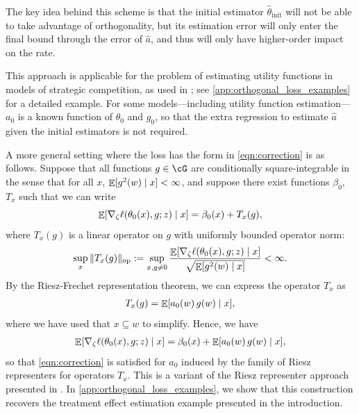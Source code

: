 \documentclass[11pt]{article} %
\newcommand{\pref}[1]{\cref{#1}}
\theoremstyle{theorem}  %
\theoremstyle{plain}
\DeclarePairedDelimiter{\brk}{[}{]}
\DeclarePairedDelimiter{\nrm}{\|}{\|}
\DeclareMathOperator{\En}{\mathbb{E}}
\newcommand{\ls}{\ell}
\newcommand{\wh}[1]{\widehat{#1}}
\newcommand{\grad}{\nabla}
\newcommand{\midsem}{;\,}
\newcommand{\poprisk}{L_{\cD}}
\newcommand{\approxleq}{\lesssim}
\newcommand{\estone}{\wh{g}}
\newcommand{\esttwo}{\wh{\theta}}
\newcommand{\esttwoinit}{\wh{\theta}_{\mathrm{init}}}
\newcommand{\nuisance}{\cG}
\newcommand{\target}{\Theta}
\newcommand{\Rate}{\mathrm{Rate}_{\cD}}
\newcommand{\besttwo}{\theta^{\star}}
\newcommand{\gtone}{g_0}
\newcommand{\gttwo}{\theta_0}
\newcommand{\sampleone}{S_1}
\newcommand{\sampletwo}{S_2}
\begin{document}
The key idea behind this scheme is that the initial estimator
$\wh{\theta}_{\mathrm{init}}$ will not be able to take advantage of
orthogonality, but its estimation error will only enter the final
bound through the error of $\wh{a}$, and thus will only have
higher-order impact on the rate. 
%
%
%
%
%
%
%

This approach is applicable for the problem of estimating
utility functions in models of strategic competition, as used in
\cite{chernozhukov2018plugin}; see \pref{app:orthogonal_loss_examples}
for a detailed example. For some models---including utility function
estimation---$a_0$ is a known function of $\theta_0$ and $g_0$, so
that the extra regression to estimate $\wh{a}$ given the initial
estimators is not required.

A more general setting where the loss has the form in
\pref{eqn:correction} is as follows. Suppose that all functions
$g\in\cG$ are conditionally square-integrable in the sense that for
all $x$, $\En\brk{g^2(w)\mid{} x}<\infty$, and suppose there exist
functions $\beta_0$, $T_x$ such that we can
write
\[
	\En\brk*{\grad_{\zeta}\ls(\gttwo(x), g;z)\mid{}x} = \beta_0(x) + T_x(g),
\]
where $T_x(g)$ is a linear operator on $g$ with uniformly bounded operator norm:
\begin{equation}
\sup_{x}\|T_x(g)\|_{\text{op}}:= \sup_{x, g \neq 0} \frac{\En\brk*{\grad_{\zeta}\ls(\gttwo(x), g;z)\mid{}x}}{\sqrt{\En\brk*{g^2(w)\mid{}x}}}  < \infty.
\end{equation}
By the Riesz-Frechet representation theorem, we can express the
operator $T_x$ as
\begin{align}
T_x(g) = \En\brk*{a_0(w)\, g(w)\mid{} x},
\end{align}
where we have used that $x\subseteq w$ to simplify. Hence, we have
\begin{align}
\En\brk*{\grad_{\zeta}\ls(\gttwo(x), g;z)\mid{}x} = \beta_0(x) + \En\brk*{a_0(w)\, g(w)\mid{} x},
\end{align}
so that
\pref{eqn:correction} is satisfied for $a_0$ induced by the family of Riesz representers for operators $T_x$. This is a variant of the Riesz representer approach presented
in \cite{chernozhukov2018riesz}. In
\pref{app:orthogonal_loss_examples}, we show that this construction
recovers the treatment effect estimation example presented in the introduction.
\end{document}
